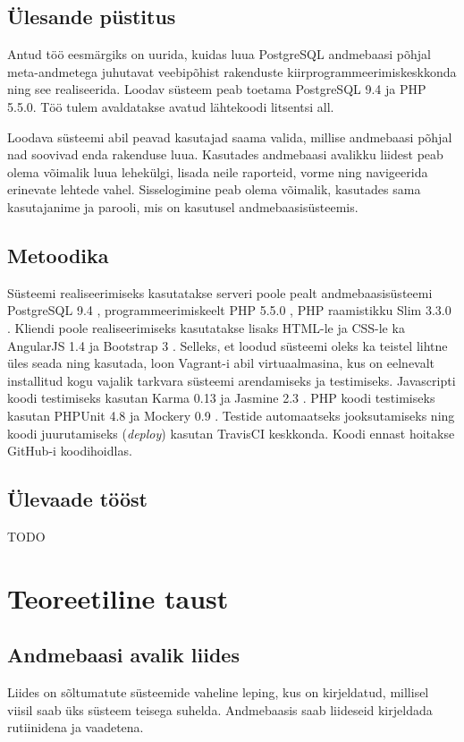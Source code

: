 \documentclass[a4paper,12pt]{article} %
\begin{document}
\subsection{Ülesande püstitus}
Antud töö eesmärgiks on uurida, kuidas luua PostgreSQL andmebaasi põhjal meta-andmetega juhutavat veebipõhist rakenduste kiirprogrammeerimiskeskkonda ning see realiseerida. Loodav süsteem peab toetama PostgreSQL 9.4 ja PHP 5.5.0.
Töö tulem avaldatakse avatud lähtekoodi litsentsi all. \par
Loodava süsteemi abil peavad kasutajad saama valida, millise andmebaasi põhjal nad soovivad enda rakenduse luua. Kasutades andmebaasi avalikku liidest peab olema võimalik luua lehekülgi, lisada neile raporteid, vorme ning navigeerida erinevate lehtede vahel. Sisselogimine peab olema võimalik, kasutades sama kasutajanime ja parooli, mis on kasutusel andmebaasisüsteemis.
\subsection{Metoodika}
Süsteemi realiseerimiseks kasutatakse serveri poole pealt andmebaasisüsteemi PostgreSQL 9.4 \cite{PostgreSQL}, programmeerimiskeelt PHP 5.5.0 \cite{PHP}, PHP raamistikku Slim 3.3.0 \cite{SlimFW}. Kliendi poole realiseerimiseks kasutatakse lisaks HTML-le ja CSS-le ka AngularJS 1.4 \cite{AngularJS} ja Bootstrap 3 \cite{Bootstrap}.
Selleks, et loodud süsteemi oleks ka teistel lihtne üles seada ning kasutada, loon Vagrant-i \cite{Vagrant} abil virtuaalmasina, kus on eelnevalt installitud kogu vajalik tarkvara süsteemi arendamiseks ja testimiseks. Javascripti koodi testimiseks kasutan Karma 0.13 \cite{karma} ja Jasmine 2.3 \cite{Jasmine}. PHP koodi testimiseks kasutan PHPUnit 4.8 \cite{PHPUnit} ja Mockery 0.9 \cite{Mockery}. Testide automaatseks jooksutamiseks ning koodi juurutamiseks (\textit{deploy}) kasutan TravisCI \cite{TravisCI} keskkonda. Koodi ennast hoitakse GitHub-i \cite{GitHub} koodihoidlas.
\subsection{Ülevaade tööst}
TODO
\pagebreak

\section{Teoreetiline taust}
\subsection{Andmebaasi avalik liides}
Liides on sõltumatute süsteemide vaheline leping, kus on kirjeldatud, millisel viisil saab üks süsteem teisega suhelda.
Andmebaasis saab liideseid kirjeldada rutiinidena ja vaadetena.
\end{document}
